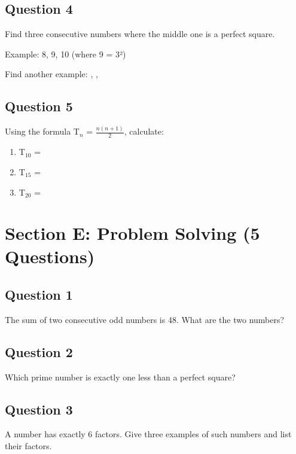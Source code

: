 \documentclass{article}
\begin{document}
\subsection*{Question 4}
Find three consecutive numbers where the middle one is a perfect square.

Example: 8, 9, 10 (where 9 = 3²)

Find another example: \underline{\hspace{1cm}}, \underline{\hspace{1cm}}, \underline{\hspace{1cm}}

\subsection*{Question 5}
Using the formula T$_n$ = $\frac{n(n+1)}{2}$, calculate:
\begin{enumerate}
    \item T$_{10}$ = \underline{\hspace{2cm}}
    \item T$_{15}$ = \underline{\hspace{2cm}}
    \item T$_{20}$ = \underline{\hspace{2cm}}
\end{enumerate}

\section{Section E: Problem Solving (5 Questions)}

\subsection*{Question 1}
The sum of two consecutive odd numbers is 48. What are the two numbers?

\vspace{2cm}

\subsection*{Question 2}
Which prime number is exactly one less than a perfect square?

\vspace{2cm}

\subsection*{Question 3}
A number has exactly 6 factors. Give three examples of such numbers and list their factors.
\end{document}
